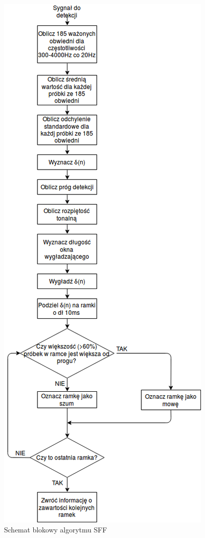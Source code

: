 \documentclass[eng,printmode]{mgr}
\begin{document}
 \begin{figure}
 	\begin{center}
 		\includegraphics[scale=0.6]{SFFAlgorithm.png}
 		\caption{Schemat blokowy algorytmu SFF} 
 	\end{center}
 \end{figure}
 
\end{document}
